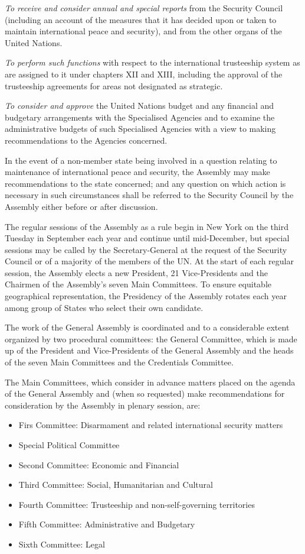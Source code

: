 \documentclass[
  openany]{book}
\providecommand{\tightlist}{%
  \setlength{\itemsep}{0pt}\setlength{\parskip}{0pt}}
\begin{document}
\emph{To receive and consider annual and special reports} from the Security Council (including an account of the measures that it has decided upon or taken to maintain international peace and security), and from the other organs of the United Nations.

\emph{To perform such functions} with respect to the international trusteeship system as are assigned to it under chapters XII and XIII, including the approval of the trusteeship agreements for areas not designated as strategic.

\emph{To consider and approve} the United Nations budget and any financial and budgetary arrangements with the Specialised Agencies and to examine the administrative budgets of such Specialised Agencies with a view to making recommendations to the Agencies concerned.

In the event of a non-member state being involved in a question relating to maintenance of international peace and security, the Assembly may make recommendations to the state concerned; and any question on which action is necessary in such circumstances shall be referred to the Security Council by the Assembly either before or after discussion.

The regular sessions of the Assembly as a rule begin in New York on the third Tuesday in September each year and continue until mid-December, but special sessions may be called by the Secretary-General at the request of the Security Council or of a majority of the members of the UN. At the start of each regular session, the Assembly elects a new President, 21 Vice-Presidents and the Chairmen of the Assembly's seven Main Committees. To ensure equitable geographical representation, the Presidency of the Assembly rotates each year among group of States who select their own candidate.

The work of the General Assembly is coordinated and to a considerable extent organized by two procedural committees: the General Committee, which is made up of the President and Vice-Presidents of the General Assembly and the heads of the seven Main Committees and the Credentials Committee.

The Main Committees, which consider in advance matters placed on the agenda of the General Assembly and (when so requested) make recommendations for consideration by the Assembly in plenary session, are:

\begin{itemize}
\tightlist
\item
  Firs Committee: Disarmament and related international security matters
\item
  Special Political Committee
\item
  Second Committee: Economic and Financial
\item
  Third Committee: Social, Humanitarian and Cultural
\item
  Fourth Committee: Trusteeship and non-self-governing territories
\item
  Fifth Committee: Administrative and Budgetary
\item
  Sixth Committee: Legal
\end{itemize}
\end{document}
